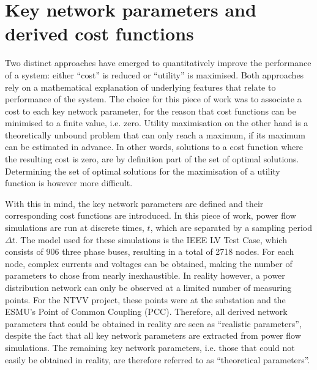 \section{Key network parameters and derived cost functions}
\label{ch1:sec:key-network-parameters}

Two distinct approaches have emerged to quantitatively improve the performance of a system: either ``cost'' is reduced or ``utility'' is maximised.
Both approaches rely on a mathematical explanation of underlying features that relate to performance of the system.
The choice for this piece of work was to associate a cost to each key network parameter, for the reason that cost functions can be minimised to a finite value, i.e. zero.
Utility maximisation on the other hand is a theoretically unbound problem that can only reach a maximum, if its maximum can be estimated in advance.
In other words, solutions to a cost function where the resulting cost is zero, are by definition part of the set of optimal solutions.
Determining the set of optimal solutions for the maximisation of a utility function is however more difficult.


With this in mind, the key network parameters are defined and their corresponding cost functions are introduced.
In this piece of work, power flow simulations are run at discrete times, $t$, which are separated by a sampling period $\Delta t$. 
The model used for these simulations is the IEEE LV Test Case, which consists of 906 three phase buses, resulting in a total of 2718 nodes.
For each node, complex currents and voltages can be obtained, making the number of parameters to chose from nearly inexhaustible.
In reality however, a power distribution network can only be observed at a limited number of measuring points.
For the NTVV project, these points were at the substation and the ESMU's Point of Common Coupling (PCC).
Therefore, all derived network parameters that could be obtained in reality are seen as ``realistic parameters'', despite the fact that all key network parameters are extracted from power flow simulations.
The remaining key network parameters, i.e. those that could not easily be obtained in reality, are therefore referred to as ``theoretical parameters''.

